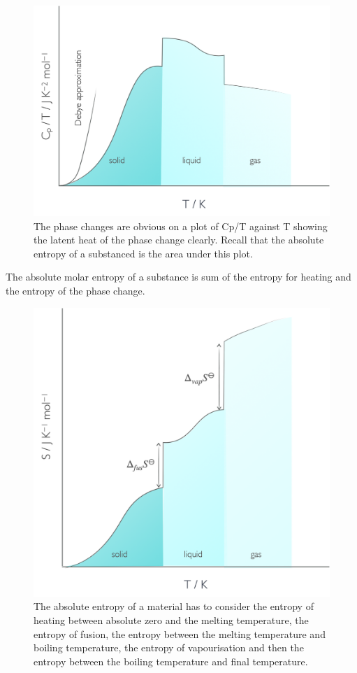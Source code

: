 \documentclass[
]{book}
\begin{document}
\begin{figure}

{\centering \includegraphics[width=0.8\linewidth]{images/Cpphase} 

}

\caption{The phase changes are obvious on a plot of Cp/T against T showing the latent heat of the phase change clearly. Recall that the absolute entropy of a substanced is the area under this plot.}\label{fig:Cpphase}
\end{figure}

The absolute molar entropy of a substance is sum of the entropy for heating and the entropy of the phase change.

\begin{figure}

{\centering \includegraphics[width=0.8\linewidth]{images/entropyphase} 

}

\caption{The absolute entropy of a material has to consider the entropy of heating between absolute zero and the melting temperature, the entropy of fusion, the entropy between the melting temperature and boiling temperature, the entropy of vapourisation and then the entropy between the boiling temperature and final temperature.}\label{fig:entropyphase}
\end{figure}
\end{document}
